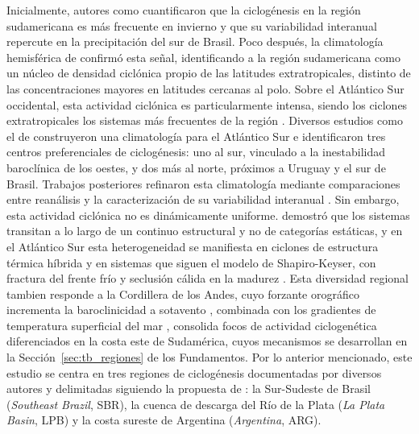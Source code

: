 Inicialmente, autores como \citet{gan1991surface} cuantificaron que la ciclogénesis en la región sudamericana es más frecuente en invierno y que su variabilidad interanual repercute en la precipitación del sur de Brasil. 
Poco después, la climatología hemisférica de \citet{jones1993climatology} confirmó esta señal, identificando a la región sudamericana como un núcleo de densidad ciclónica propio de las latitudes extratropicales, distinto de las concentraciones mayores en latitudes cercanas al polo.
Sobre el Atlántico Sur occidental, esta actividad ciclónica es particularmente intensa, siendo los ciclones extratropicales los sistemas más frecuentes de la región \citep{reboita2026meteorology}.
Diversos estudios como el de \citet{reboita2010south} construyeron una climatología para el Atlántico Sur e identificaron tres centros preferenciales de ciclogénesis: uno al sur, vinculado a la inestabilidad baroclínica de los oestes, y dos más al norte, próximos a Uruguay y el sur de Brasil.
Trabajos posteriores refinaron esta climatología mediante comparaciones entre reanálisis \citep{gramcianinov2020analysis} y la caracterización de su variabilidad interanual \citep{padilhareinke2026characterization}.
Sin embargo, esta actividad ciclónica no es dinámicamente uniforme. \citet{hart2003cyclone} demostró que los sistemas transitan a lo largo de un continuo estructural y no de categorías estáticas, y en el Atlántico Sur esta heterogeneidad se manifiesta en ciclones de estructura térmica híbrida \citep{evans2012climatology} y en sistemas que siguen el modelo de Shapiro-Keyser, con fractura del frente frío y seclusión cálida en la madurez \citep{gozzo2013air}.
Esta diversidad regional tambien responde a la Cordillera de los Andes, cuyo forzante orográfico incrementa la baroclinicidad a sotavento \citep{gan1994influence}, combinada con los gradientes de temperatura superficial del mar \citep{reboita2026meteorology}, consolida focos de actividad ciclogenética diferenciados en la costa este de Sudamérica, cuyos mecanismos se desarrollan en la Sección~\ref{sec:tb_regiones} de los Fundamentos.
\label{sec:definicion_regiones}%
Por lo anterior mencionado, este estudio se centra en tres regiones de ciclogénesis documentadas por diversos autores \citep{crespo2020potential, gramcianinov2019properties, reboita2026meteorology} y delimitadas siguiendo la propuesta de \citet{gramcianinov2019properties}: la Sur-Sudeste de Brasil (\textit{Southeast Brazil}, SBR), la cuenca de descarga del Río de la Plata (\textit{La Plata Basin}, LPB) y la costa sureste de Argentina (\textit{Argentina}, ARG).

